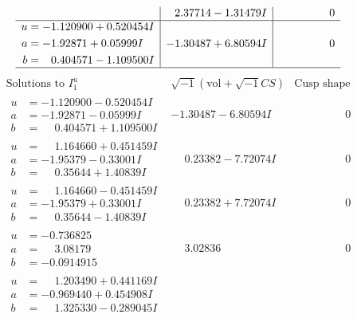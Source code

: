 \documentclass[1p]{elsarticle_modified}
\theoremstyle{definition}
\newcommand{\I}{\sqrt{-1}}
\begin{document}
$$\begin{array}{c|c|c}
 & \phantom{-}2.37714 - 1.31479 I & \phantom{-0.000000 } 0 \\ \hline\begin{aligned}
u &= -1.120900 + 0.520454 I \\
a &= -1.92871 + 0.05999 I \\
b &= \phantom{-}0.404571 - 1.109500 I\end{aligned}
 & -1.30487 + 6.80594 I & \phantom{-0.000000 } 0\\
 \hline 
 \end{array}$$\newpage$$\begin{array}{c|c|c}  
\text{Solutions to }I^u_{1}& \I (\text{vol} + \sqrt{-1}CS) & \text{Cusp shape}\\
 \hline 
\begin{aligned}
u &= -1.120900 - 0.520454 I \\
a &= -1.92871 - 0.05999 I \\
b &= \phantom{-}0.404571 + 1.109500 I\end{aligned}
 & -1.30487 - 6.80594 I & \phantom{-0.000000 } 0 \\ \hline\begin{aligned}
u &= \phantom{-}1.164660 + 0.451459 I \\
a &= -1.95379 - 0.33001 I \\
b &= \phantom{-}0.35644 + 1.40839 I\end{aligned}
 & \phantom{-}0.23382 - 7.72074 I & \phantom{-0.000000 } 0 \\ \hline\begin{aligned}
u &= \phantom{-}1.164660 - 0.451459 I \\
a &= -1.95379 + 0.33001 I \\
b &= \phantom{-}0.35644 - 1.40839 I\end{aligned}
 & \phantom{-}0.23382 + 7.72074 I & \phantom{-0.000000 } 0 \\ \hline\begin{aligned}
u &= -0.736825\phantom{ +0.000000I} \\
a &= \phantom{-}3.08179\phantom{ +0.000000I} \\
b &= -0.0914915\phantom{ +0.000000I}\end{aligned}
 & \phantom{-}3.02836\phantom{ +0.000000I} & \phantom{-0.000000 } 0 \\ \hline\begin{aligned}
u &= \phantom{-}1.203490 + 0.441169 I \\
a &= -0.969440 + 0.454908 I \\
b &= \phantom{-}1.325330 - 0.289045 I\end{aligned}

\end{array}$$
\end{document}
